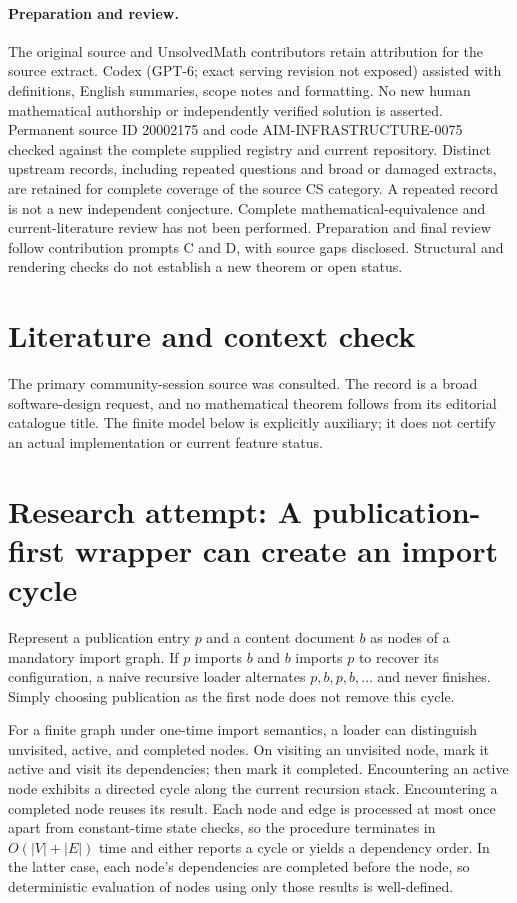 \documentclass[11pt]{article}
\begin{document}
\paragraph{Preparation and review.}
The original source and UnsolvedMath contributors retain attribution for the source extract. Codex (GPT-6; exact serving revision not exposed) assisted with definitions, English summaries, scope notes and formatting. No new human mathematical authorship or independently verified solution is asserted. Permanent source ID 20002175 and code AIM-INFRASTRUCTURE-0075 checked against the complete supplied registry and current repository. Distinct upstream records, including repeated questions and broad or damaged extracts, are retained for complete coverage of the source CS category. A repeated record is not a new independent conjecture. Complete mathematical-equivalence and current-literature review has not been performed. Preparation and final review follow contribution prompts C and D, with source gaps disclosed. Structural and rendering checks do not establish a new theorem or open status.
\label{end:20002175}

\section{Literature and context check}
The primary community-session source was consulted. The record is a broad software-design request, and no mathematical theorem follows from its editorial catalogue title. The finite model below is explicitly auxiliary; it does not certify an actual implementation or current feature status.
\section{Research attempt: A publication-first wrapper can create an import cycle}
Represent a publication entry $p$ and a content document $b$ as nodes of a mandatory import graph. If $p$ imports $b$ and $b$ imports $p$ to recover its configuration, a naive recursive loader alternates $p,b,p,b,\ldots$ and never finishes. Simply choosing publication as the first node does not remove this cycle.

For a finite graph under one-time import semantics, a loader can distinguish unvisited, active, and completed nodes. On visiting an unvisited node, mark it active and visit its dependencies; then mark it completed. Encountering an active node exhibits a directed cycle along the current recursion stack. Encountering a completed node reuses its result. Each node and edge is processed at most once apart from constant-time state checks, so the procedure terminates in $O(|V|+|E|)$ time and either reports a cycle or yields a dependency order. In the latter case, each node's dependencies are completed before the node, so deterministic evaluation of nodes using only those results is well-defined.
\end{document}
